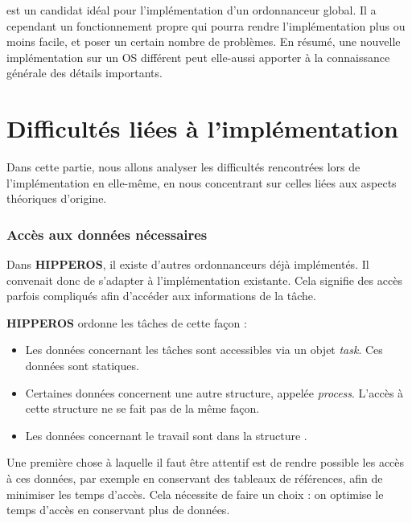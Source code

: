 	 est un candidat idéal pour l'implémentation d'un ordonnanceur 
	global. Il a cependant un fonctionnement propre qui pourra rendre l'implémentation 
	plus ou moins facile, et poser un certain nombre de problèmes. 
	En résumé, une nouvelle implémentation sur un OS différent 
	peut elle-aussi apporter à la connaissance générale des détails importants.
		
		

\section{Difficultés liées à l'implémentation}

	Dans cette partie, nous allons analyser les difficultés rencontrées lors de l'implémentation en elle-même, 
	en nous concentrant sur celles liées aux aspects théoriques d'origine. 

	\subsubsection{Accès aux données nécessaires}
	
		Dans \textbf{HIPPEROS}, il existe d'autres ordonnanceurs déjà implémentés. Il convenait donc 
		de s'adapter à l'implémentation existante. Cela signifie des accès parfois compliqués afin d'accéder 
		aux informations de la tâche.\newline
		
		\textbf{HIPPEROS} ordonne les tâches de cette façon : 
		\begin{itemize}
			\item Les données concernant les tâches sont accessibles via un objet \textit{task}. Ces 
			données sont statiques.
			\item Certaines données concernent une autre structure, appelée \textit{process}. L'accès 
			à cette structure ne se fait pas de la même façon. 
			\item Les données concernant le travail sont dans la structure .
		\end{itemize}
		Une première chose à laquelle il faut être attentif est de rendre possible les accès 
		à ces données, par exemple en conservant des tableaux de références, afin de minimiser les temps 
		d'accès. Cela nécessite de faire un choix : on optimise le temps d'accès en conservant plus de données. \newline
	
